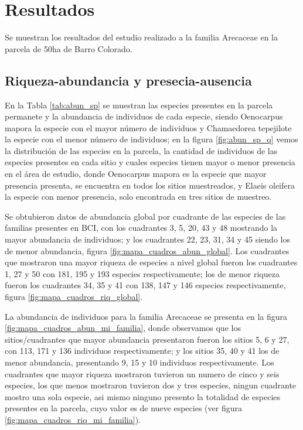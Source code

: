 \documentclass[11pt,]{article}
\begin{document}
\section{Resultados}\label{resultados}

Se muestran los resultados del estudio realizado a la familia Arecaceae
en la parcela de 50ha de Barro Colorado.

\subsection{Riqueza-abundancia y
presecia-ausencia}\label{riqueza-abundancia-y-presecia-ausencia}

En la Tabla \ref{tab:abun_sp} se muestran las especies presentes en la
parcela permanete y la abundancia de individuos de cada especie, siendo
Oenocarpus mapora la especie con el mayor número de individuos y
Chamaedorea tepejilote la especie con el menor número de individuos; en
la figura \ref{fig:abun_sp_q} vemos la distribución de las especies en
la parcela, la cantidad de individuos de las especies presentes en cada
sitio y cuales especies tienen mayor o menor presencia en el área de
estudio, donde Oenocarpus mapora es la especie que mayor presencia
presenta, se encuentra en todos los sitios muestreados, y Elaeis
oleifera la especie con menor presencia, solo encontrada en tres sitios
de muestreo.

Se obtubieron datos de abundancia global por cuadrante de las especies
de las familias presentes en BCI, con los cuadrantes 3, 5, 20, 43 y 48
mostrando la mayor abundancia de individuos; y los cuadrantes 22, 23,
31, 34 y 45 siendo los de menor abundancia, figura
\ref{fig:mapa_cuadros_abun_global}. Los cuadrantes que mostraron una
mayor riqueza de especies a nivel global fueron los cuadrantes 1, 27 y
50 con 181, 195 y 193 especies respectivamente; los de menor riqueza
fueron los cuadrantes 34, 35 y 41 con 138, 147 y 146 especies
respectivamente, figura \ref{fig:mapa_cuadros_riq_global}.

La abundancia de individuos para la familia Arecaceae se presenta en la
figura \ref{fig:mapa_cuadros_abun_mi_familia}, donde observamos que los
sitios/cuadrantes que mayor abundancia presentaron fueron los sitios 5,
6 y 27, con 113, 171 y 136 individuos respectivamente; y los sitios 35,
40 y 41 los de menor abundancia, presentando 9, 15 y 10 individuos
respectivamente. Los cuadrantes que mayor riqueza mostraron tuvieron un
numero de cinco y seis especies, los que menos mostraron tuvieron dos y
tres especies, ningun cuadrante mostro una sola especie, asi mismo
ninguno presento la totalidad de especies presentes en la parcela, cuyo
valor es de nueve especies (ver figura
\ref{fig:mapa_cuadros_riq_mi_familia}).
\end{document}
